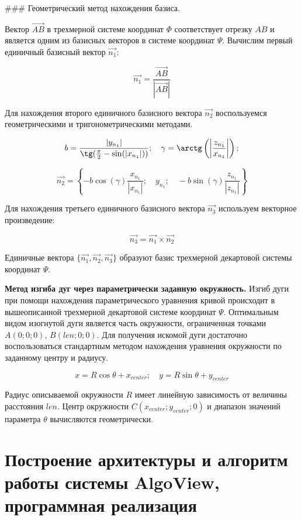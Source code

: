 ### Геометрический метод нахождения базиса.

Вектор $\overrightarrow{AB}$ в трехмерной системе координат $\Phi$ соответствует отрезку $AB$ и является одним из базисных векторов в системе координат $\Psi$. Вычислим первый единичный базисный вектор $\overrightarrow{n_1}$:

$$
\overrightarrow{n_1} = \frac
{\overrightarrow{AB}}
{\left|\overrightarrow{AB}\right|}
$$

Для нахождения второго единичного базисного вектора $\overrightarrow{n_2}$ воспользуемся геометрическими и тригонометрическими методами. 

$$
b = \frac
{\left|y_{n_1}\right|}
{\tg(
\frac{\pi}{2}
-\sin(\left|x_{n_1}\right|)
)};
\quad
\gamma = \arctg\left(
\left|
\frac{z_{n_1}}{x_{n_1}}
\right|
\right);
$$

$$
\overrightarrow{n_2} = \left\{
-b\cos(\gamma)
\frac{x_{n_1}}
{\left|x_{n_1}\right|};
\quad
y_{n_1};
\quad
-b\sin(\gamma)
\frac{z_{n_1}}
{\left|z_{n_1}\right|}
\right\}
$$

Для нахождения третьего единичного базисного вектора $\overrightarrow{n_3}$ используем векторное произведение:

$$
\overrightarrow{n_3} = \overrightarrow{n_1} \times \overrightarrow{n_2}
$$

Единичные вектора $\{\overrightarrow{n_1}, \overrightarrow{n_2}, \overrightarrow{n_3}\}$ образуют базис трехмерной декартовой системы координат $\Psi$.

\textbf{Метод изгиба дуг через параметрически заданную окружность.} Изгиб дуги при помощи нахождения параметрического уравнения кривой происходит в вышеописанной трехмерной декартовой системе координат $\Psi$. Оптимальным видом изогнутой дуги является часть окружности, ограниченная точками $A(0; 0; 0)$, $B\left(len; 0; 0 \right)$. Для получения искомой дуги достаточно воспользоваться стандартным методом нахождения уравнения окружности по заданному центру и радиусу.

$$
x = R\cos\theta + x_{center}; \quad
y = R\sin\theta + y_{center}
$$

Радиус описываемой окружности $R$ имеет линейную зависимость от величины расстояния $len$. Центр окружности $C(x_{center}; y_{center}; 0)$ и диапазон значений параметра $\theta$ вычисляются геометрически.

\section{Построение архитектуры и алгоритм работы системы AlgoView, программная реализация}

